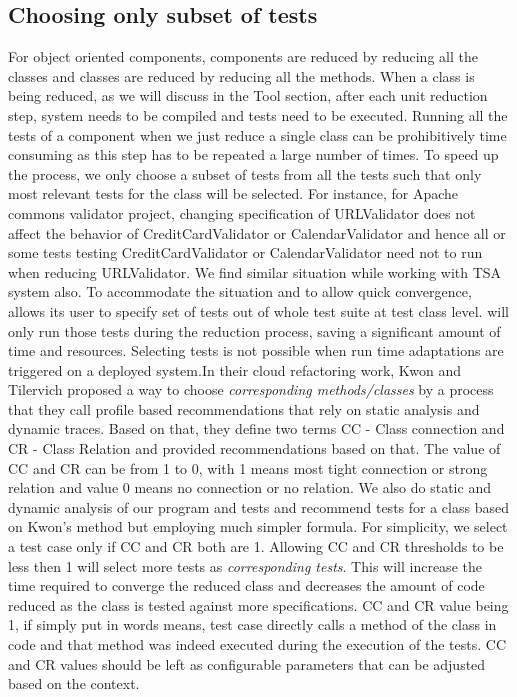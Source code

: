 \subsection{Choosing only subset of tests}
For object oriented components, components are reduced by reducing all the classes and classes are reduced by reducing all the methods. When a class is being reduced, as we will discuss in the Tool section, after each unit reduction step, system needs to be compiled and tests need to be executed. Running all the tests of a component when we just reduce a single class can be prohibitively time consuming as this step has to be repeated a large number of times. To speed up the process, we only choose a subset of tests from all the tests such that only most relevant tests for the class will be selected. For instance, for Apache commons validator project, changing specification of URLValidator does not affect the behavior of CreditCardValidator or CalendarValidator and hence all or some tests testing CreditCardValidator or CalendarValidator need not to run when reducing URLValidator. We find similar situation while working with TSA system also. To accommodate the situation and to allow quick convergence, \mytool allows its user to specify set of tests out of whole test suite at test class level. \mytool will only run those tests during the reduction process, saving a significant amount of time and resources. Selecting tests is not possible when run time adaptations are triggered on a deployed system.In their cloud refactoring work, Kwon and Tilervich proposed a way to choose \emph{corresponding methods/classes}  by a process that they call profile based recommendations that rely on static analysis and dynamic traces. Based on that, they define two terms CC - Class connection and CR - Class Relation and provided recommendations based on that. The value of CC and CR can be from 1 to 0, with 1 means most tight connection or strong relation and value 0 means no connection or no relation. We also do static and dynamic analysis of our program and tests and recommend tests for a class based on Kwon's method but employing much simpler formula. For simplicity, we select a test case only if CC and CR both are 1. Allowing CC and CR thresholds to be less then 1 will select more tests as \emph{corresponding tests}. This will increase the time required to converge the reduced class and decreases the amount of code reduced as the class is tested against more specifications. CC and CR value being 1, if simply put in words means, test case directly calls a method of the class in code and that method was indeed executed during the execution of the tests. CC and CR values should be left as configurable parameters that can be adjusted based on the context.      
